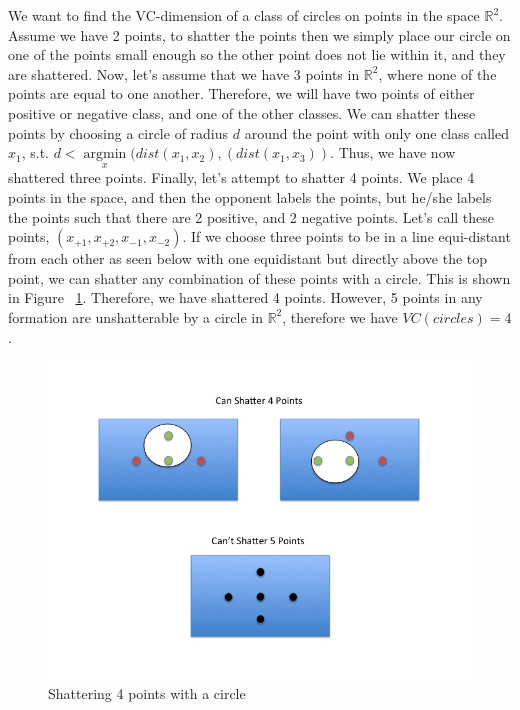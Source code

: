 \documentclass[paper=a4, fontsize=11pt]{scrartcl} %
\begin{document}
We want to find the VC-dimension of a class of circles on points in the space $\mathbb{R}^2$.  Assume we have 2 points, to shatter the points then we simply place our circle on one of the points small enough so the other point does not lie within it, and they are shattered.  Now, let's assume that we have 3 points in $\mathbb{R}^2$, where none of the points are equal to one another.  Therefore, we will have two points of either positive or negative class, and one of the other classes.  We can shatter these points by choosing a circle of radius $d$ around the point with only one class called $x_1$, s.t. $d<\underset{x}{\operatorname{argmin}}(dist(x_1,x_2),(dist(x_1,x_3))$.  Thus, we have now shattered three points. Finally, let's attempt to shatter 4 points.  We place 4 points in the space, and then the opponent labels the points, but he/she labels the points such that there are 2 positive, and 2 negative points.  Let's call these points, $(x_{+1},x_{+2},x_{-1},x_{-2})$.  If we choose three points to be in a line equi-distant from each other as seen below with one equidistant but directly above the top point, we can shatter any combination of these points with a circle. This is shown in Figure ~\ref{fig:shattering}.  Therefore, we have shattered 4 points.  However, 5 points in any formation are unshatterable by a circle in $\mathbb{R}^2$, therefore we have $VC(circles) = 4$.

\begin{figure}[h]
\centering
\includegraphics[scale=0.4]{Slide1.jpg}
\caption{Shattering 4 points with a circle}
\label{fig:shattering}
\end{figure}
\end{document}
